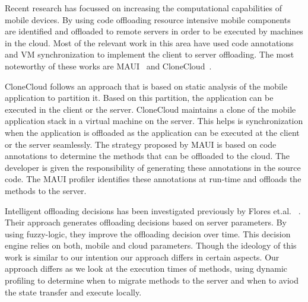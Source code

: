 Recent research has focussed on increasing the computational capabilities of mobile devices. By using code offloading
resource intensive mobile components are identified and offloaded to remote servers in order to be executed
by machines in the cloud. Most of the relevant work in this area have used code annotations and VM synchronization to
implement the client to server offloading. The most noteworthy of these works are MAUI~\cite{maui} and CloneCloud~\cite{ccloud}.

CloneCloud follows an approach that is based on static analysis of the mobile application to partition it.
Based on this partition, the application can be executed in the client or the server. CloneCloud maintains
a clone of the mobile application stack in a virtual machine on the server. This helps is synchronization
when the application is offloaded as the application can be executed at the client or the server seamlessly.
The strategy proposed by MAUI is based on code annotations to determine the methods that can be offloaded to the
cloud. The developer is given the responsibility of generating these annotations in the source code. The MAUI
profiler identifies these annotations at run-time and offloads the methods to the server.

Intelligent offloading decisions has been investigated previously by Flores et.al. ~\cite{fuzzy}. Their approach
generates offloading decisions based on server parameters. By using fuzzy-logic, they improve the offloading decision
over time. This decision engine relies on both, mobile and cloud parameters. Though the ideology of this work is similar
to our intention our approach differs in certain aspects. Our approach differs as we look
at the execution times of methods, using dynamic profiling to determine when to migrate methods to the server and when
to aviod the state transfer and execute locally.

